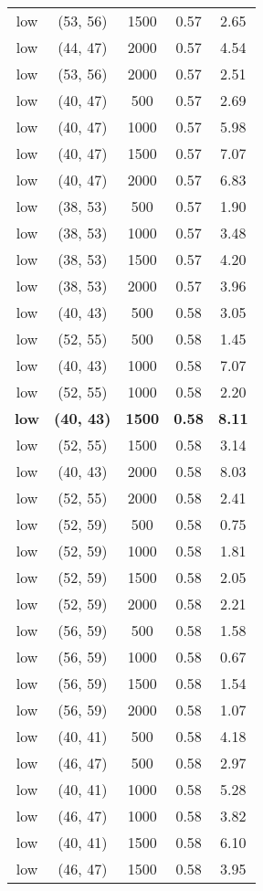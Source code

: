 \begin{tabular}{c c c c c}
low & (53, 56) &  1500 & 0.57 & 2.65 \\
low & (44, 47) &  2000 & 0.57 & 4.54 \\
low & (53, 56) &  2000 & 0.57 & 2.51 \\
low & (40, 47) &  500 & 0.57 & 2.69 \\
low & (40, 47) &  1000 & 0.57 & 5.98 \\
low & (40, 47) &  1500 & 0.57 & 7.07 \\
low & (40, 47) &  2000 & 0.57 & 6.83 \\
low & (38, 53) &  500 & 0.57 & 1.90 \\
low & (38, 53) &  1000 & 0.57 & 3.48 \\
low & (38, 53) &  1500 & 0.57 & 4.20 \\
low & (38, 53) &  2000 & 0.57 & 3.96 \\
low & (40, 43) &  500 & 0.58 & 3.05 \\
low & (52, 55) &  500 & 0.58 & 1.45 \\
low & (40, 43) &  1000 & 0.58 & 7.07 \\
low & (52, 55) &  1000 & 0.58 & 2.20 \\
\textbf{low} & \textbf{(40, 43)} & \textbf{ 1500} & \textbf{0.58} & \textbf{8.11} \\
low & (52, 55) &  1500 & 0.58 & 3.14 \\
low & (40, 43) &  2000 & 0.58 & 8.03 \\
low & (52, 55) &  2000 & 0.58 & 2.41 \\
low & (52, 59) &  500 & 0.58 & 0.75 \\
low & (52, 59) &  1000 & 0.58 & 1.81 \\
low & (52, 59) &  1500 & 0.58 & 2.05 \\
low & (52, 59) &  2000 & 0.58 & 2.21 \\
low & (56, 59) &  500 & 0.58 & 1.58 \\
low & (56, 59) &  1000 & 0.58 & 0.67 \\
low & (56, 59) &  1500 & 0.58 & 1.54 \\
low & (56, 59) &  2000 & 0.58 & 1.07 \\
low & (40, 41) &  500 & 0.58 & 4.18 \\
low & (46, 47) &  500 & 0.58 & 2.97 \\
low & (40, 41) &  1000 & 0.58 & 5.28 \\
low & (46, 47) &  1000 & 0.58 & 3.82 \\
low & (40, 41) &  1500 & 0.58 & 6.10 \\
low & (46, 47) &  1500 & 0.58 & 3.95 \\

\end{tabular}
